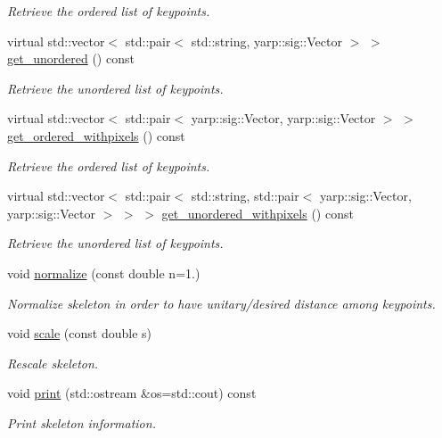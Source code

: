 \begin{DoxyCompactItemize}
\begin{DoxyCompactList}\small\item\em Retrieve the ordered list of keypoints. \end{DoxyCompactList}\item 
virtual std\+::vector$<$ std\+::pair$<$ std\+::string, yarp\+::sig\+::\+Vector $>$ $>$ \hyperlink{classassistive__rehab_1_1Skeleton_a7b9f01b2b0f5450920335347c5861a2f}{get\+\_\+unordered} () const
\begin{DoxyCompactList}\small\item\em Retrieve the unordered list of keypoints. \end{DoxyCompactList}\item 
virtual std\+::vector$<$ std\+::pair$<$ yarp\+::sig\+::\+Vector, yarp\+::sig\+::\+Vector $>$ $>$ \hyperlink{classassistive__rehab_1_1Skeleton_a270506cde494cb4261c7892edb46ce53}{get\+\_\+ordered\+\_\+withpixels} () const
\begin{DoxyCompactList}\small\item\em Retrieve the ordered list of keypoints. \end{DoxyCompactList}\item 
virtual std\+::vector$<$ std\+::pair$<$ std\+::string, std\+::pair$<$ yarp\+::sig\+::\+Vector, yarp\+::sig\+::\+Vector $>$ $>$ $>$ \hyperlink{classassistive__rehab_1_1Skeleton_a513a3dc56d55a7b10b256378ae63c6c7}{get\+\_\+unordered\+\_\+withpixels} () const
\begin{DoxyCompactList}\small\item\em Retrieve the unordered list of keypoints. \end{DoxyCompactList}\item 
void \hyperlink{classassistive__rehab_1_1Skeleton_a7753cc8d2b43e27eaf7bf9ef640a99cb}{normalize} (const double n=1.)
\begin{DoxyCompactList}\small\item\em Normalize skeleton in order to have unitary/desired distance among keypoints. \end{DoxyCompactList}\item 
void \hyperlink{classassistive__rehab_1_1Skeleton_a21fded128e2240e4dd507030b7386670}{scale} (const double s)
\begin{DoxyCompactList}\small\item\em Rescale skeleton. \end{DoxyCompactList}\item 
\mbox{\label{classassistive__rehab_1_1Skeleton_a58289ea0ba49220afac3e8d7128493b4}} 
void \hyperlink{classassistive__rehab_1_1Skeleton_a58289ea0ba49220afac3e8d7128493b4}{print} (std\+::ostream \&os=std\+::cout) const
\begin{DoxyCompactList}\small\item\em Print skeleton information. \end{DoxyCompactList}\end{DoxyCompactItemize}
